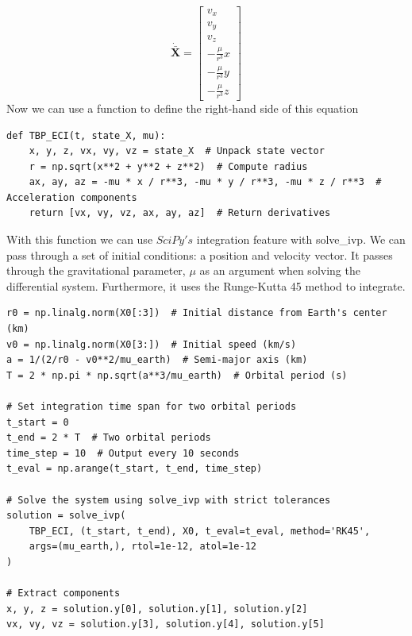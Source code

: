 \documentclass[a4paper, 12pt]{article}  %
\begin{document}
\begin{equation}
    \mathbf{\dot{\bar{X}}} = 
    \begin{bmatrix}
        v_x \\
        v_y \\
        v_z \\
        -\frac{\mu}{r^3} x \\
        -\frac{\mu}{r^3} y \\
        -\frac{\mu}{r^3} z
        \end{bmatrix}
\end{equation}
Now we can use a function to define the right-hand side of this equation
\begin{lstlisting}
def TBP_ECI(t, state_X, mu):
    x, y, z, vx, vy, vz = state_X  # Unpack state vector
    r = np.sqrt(x**2 + y**2 + z**2)  # Compute radius
    ax, ay, az = -mu * x / r**3, -mu * y / r**3, -mu * z / r**3  # Acceleration components
    return [vx, vy, vz, ax, ay, az]  # Return derivatives
\end{lstlisting}
With this function we can use $SciPy's$ integration feature with solve\_ivp. We can pass 
through a set of initial conditions: a position and velocity vector. It passes through the 
gravitational parameter, $\mu$ as an argument when solving the differential system. Furthermore, 
it uses the Runge-Kutta 45 method to integrate. 
\begin{lstlisting}
r0 = np.linalg.norm(X0[:3])  # Initial distance from Earth's center (km)
v0 = np.linalg.norm(X0[3:])  # Initial speed (km/s)
a = 1/(2/r0 - v0**2/mu_earth)  # Semi-major axis (km)
T = 2 * np.pi * np.sqrt(a**3/mu_earth)  # Orbital period (s)

# Set integration time span for two orbital periods
t_start = 0
t_end = 2 * T  # Two orbital periods
time_step = 10  # Output every 10 seconds
t_eval = np.arange(t_start, t_end, time_step)  

# Solve the system using solve_ivp with strict tolerances
solution = solve_ivp(
    TBP_ECI, (t_start, t_end), X0, t_eval=t_eval, method='RK45',
    args=(mu_earth,), rtol=1e-12, atol=1e-12
)

# Extract components
x, y, z = solution.y[0], solution.y[1], solution.y[2]
vx, vy, vz = solution.y[3], solution.y[4], solution.y[5]
\end{lstlisting}
\end{document}
